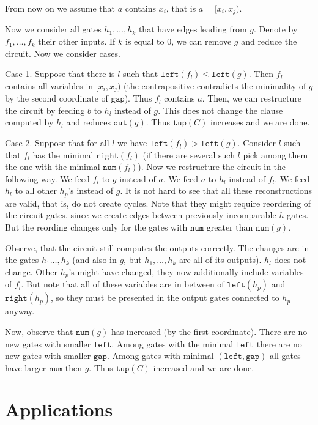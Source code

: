 \documentclass[11pt,letterpaper]{article}
\newcommand{\lef}{\texttt{left}}
\newcommand{\righ}{\texttt{right}}
\newcommand{\gap}{\texttt{gap}}
\newcommand{\num}{\texttt{num}}
\newcommand{\out}{\texttt{out}}
\newcommand{\tup}{\texttt{tup}}
\begin{document}
From now on we assume that $a$ contains $x_i$, that is $a=[x_i,x_j)$.

Now we consider all gates $h_1,\ldots, h_k$ that have edges leading from $g$. Denote by $f_1,\ldots, f_k$ their other inputs. If $k$ is equal to $0$, we can remove $g$ and reduce the circuit. Now we consider cases.

Case 1. Suppose that there is $l$ such that $\lef(f_l) \leq \lef(g)$. Then $f_l$ contains all variables in $[x_i,x_j)$ (the contrapositive contradicts the minimality of $g$ by the second coordinate of $\gap$). Thus $f_l$ contains $a$. Then, we can restructure the circuit by feeding $b$ to $h_l$ instead of $g$. This does not change the clause computed by $h_l$ and reduces $\out(g)$. Thus $\tup(C)$ increases and we are done.

Case 2. Suppose that for all $l$ we have $\lef(f_l)>\lef(g)$. Consider $l$ such that $f_l$ has the minimal $\righ(f_l)$ (if there are several such $l$ pick among them the one with the minimal $\num(f_l)$). Now we restructure the circuit in the following way. We feed $f_l$ to $g$ instead of $a$. We feed $a$ to $h_l$ instead of $f_l$. We feed $h_l$ to all other $h_p$'s instead of $g$. It is not hard to see that all these reconstructions are valid, that is, do not create cycles. Note that they might require reordering of the circuit gates, since we create edges between previously incomparable $h$-gates. But the reording changes only for the gates with $\num$ greater than $\num(g)$.

Observe, that the circuit still computes the outputs correctly. The changes are in the gates $h_1\ldots, h_k$ (and also in $g$, but $h_1,\ldots, h_k$ are all of its outputs). $h_l$ does not change. Other $h_p$'s might have changed, they now additionally include variables of $f_l$. But note that all of these variables are in between of $\lef(h_p)$ and $\righ(h_p)$, so they must be presented in the output gates connected to $h_p$ anyway.

Now, observe that $\num(g)$ has increased (by the first coordinate). There are no new gates with smaller $\lef$. Among gates with the minimal $\lef$ there are no new gates with smaller $\gap$. Among gates with minimal $(\lef,\gap)$ all gates have larger $\num$ then $g$. Thus $\tup(C)$ increased and we are done.

\section{Applications}



\end{document}
